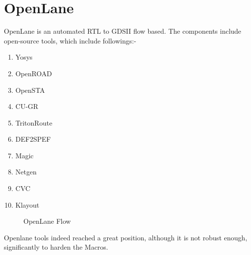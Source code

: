 \section{OpenLane}

OpenLane is an automated RTL to GDSII flow based. The components include open-source tools, which include followings:-
\begin{enumerate}
    \item Yosys
    \item OpenROAD
    \item OpenSTA
    \item CU-GR
    \item TritonRoute
    \item DEF2SPEF
    \item Magic
    \item Netgen
    \item CVC
    \item Klayout
\end{enumerate}
\begin{figure}[h]
    \centering
    \caption{OpenLane Flow}
\end{figure}

Openlane tools indeed reached a great position, although it is not robust enough, significantly to harden the Macros.